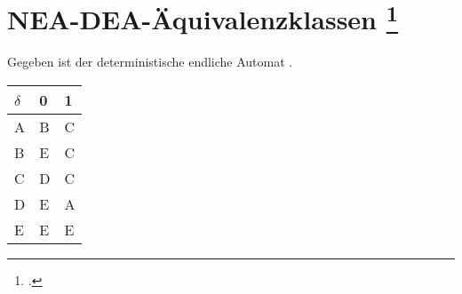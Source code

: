 \documentclass{lehramt-informatik-aufgabe}
\begin{document}
\let\f=\liFussnote
\let\l=\liLeereZelle
\def\Z#1#2{(#1, #2)}

\section{NEA-DEA-Äquivalenzklassen
\footcite[Seite 11, Aufgabe 7]{theo:ab:1}}

Gegeben ist der deterministische endliche Automat
.

\begin{center}
\begin{tabular}{l||l|l}
$\delta$ & 0 & 1 \\\hline\hline
A & B & C \\\hline
B & E & C \\\hline
C & D & C \\\hline
D & E & A \\\hline
E & E & E \\\hline
\end{tabular}
\end{center}
\end{document}
